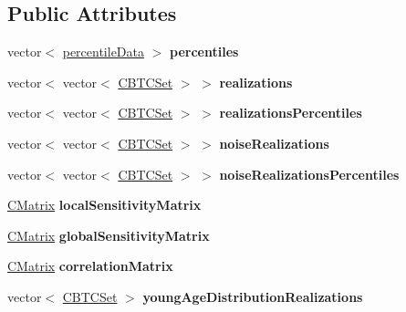 \subsection*{Public Attributes}
\begin{DoxyCompactItemize}
\item 
\mbox{\label{class_results_a407f7aaab15e893132cdf7ee3edce756}} 
vector$<$ \hyperlink{structpercentile_data}{percentile\+Data} $>$ {\bfseries percentiles}
\item 
\mbox{\label{class_results_a3476f18d2594f82645429f18c872328a}} 
vector$<$ vector$<$ \hyperlink{class_c_b_t_c_set}{C\+B\+T\+C\+Set} $>$ $>$ {\bfseries realizations}
\item 
\mbox{\label{class_results_afa2184cd9d087edfc869bb9d7ab3532d}} 
vector$<$ vector$<$ \hyperlink{class_c_b_t_c_set}{C\+B\+T\+C\+Set} $>$ $>$ {\bfseries realizations\+Percentiles}
\item 
\mbox{\label{class_results_ac7f8f6443f058488ac0e77b9e41db4d6}} 
vector$<$ vector$<$ \hyperlink{class_c_b_t_c_set}{C\+B\+T\+C\+Set} $>$ $>$ {\bfseries noise\+Realizations}
\item 
\mbox{\label{class_results_ac3a25689e1b40066666b9168823d9f46}} 
vector$<$ vector$<$ \hyperlink{class_c_b_t_c_set}{C\+B\+T\+C\+Set} $>$ $>$ {\bfseries noise\+Realizations\+Percentiles}
\item 
\mbox{\label{class_results_a76e2f9b982601d8870068d3ff4b8552a}} 
\hyperlink{class_c_matrix}{C\+Matrix} {\bfseries local\+Sensitivity\+Matrix}
\item 
\mbox{\label{class_results_a745e22c3cdd83cb9ef78c3aae034259a}} 
\hyperlink{class_c_matrix}{C\+Matrix} {\bfseries global\+Sensitivity\+Matrix}
\item 
\mbox{\label{class_results_a75222d53559297c73bc75227bd329b57}} 
\hyperlink{class_c_matrix}{C\+Matrix} {\bfseries correlation\+Matrix}
\item 
\mbox{\label{class_results_a4e9be82ed1fe6e963c2ea3abe60df77f}} 
vector$<$ \hyperlink{class_c_b_t_c_set}{C\+B\+T\+C\+Set} $>$ {\bfseries young\+Age\+Distribution\+Realizations}

\end{DoxyCompactItemize}
